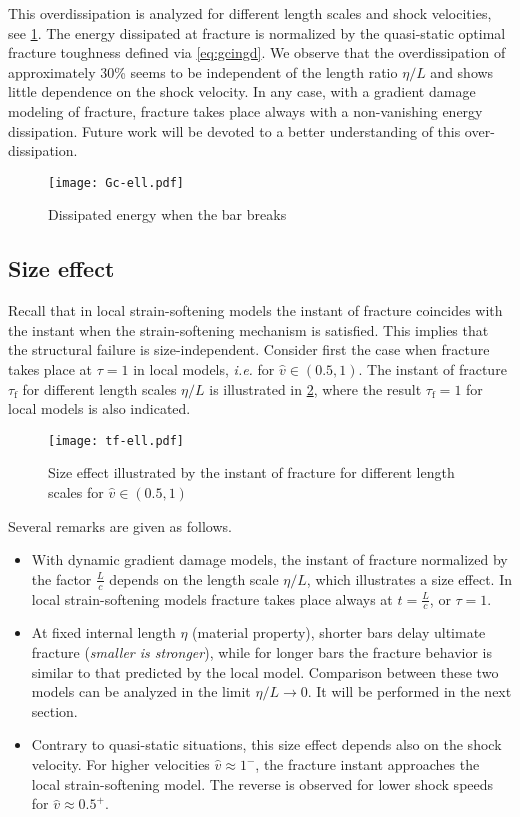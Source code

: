 This overdissipation is analyzed for different length scales and shock velocities, see \cref{fig:Gc-ell}. The energy dissipated at fracture is normalized by the quasi-static optimal fracture toughness defined via \eqref{eq:gcingd}. We observe that the overdissipation of approximately 30\% seems to be independent of the length ratio $\eta/L$ and shows little dependence on the shock velocity. In any case, with a gradient damage modeling of fracture, fracture takes place always with a non-vanishing energy dissipation. Future work will be devoted to a better understanding of this over-dissipation.
\begin{figure}[htbp]
\centering
\texttt{[image: Gc-ell.pdf]}
\caption{Dissipated energy when the bar breaks} \label{fig:Gc-ell}
\end{figure}

\subsection{Size effect}
Recall that in local strain-softening models the instant of fracture coincides with the instant when the strain-softening mechanism is satisfied. This implies that the structural failure is size-independent. Consider first the case when fracture takes place at $\tau=1$ in local models, \emph{i.e.} for $\widehat{v}\in(0.5,1)$. The instant of fracture $\tau_\mathrm{f}$ for different length scales $\eta/L$ is illustrated in \cref{fig:tfell}, where the result $\tau_\mathrm{f}=1$ for local models is also indicated.
\begin{figure}[htbp]
\centering
\texttt{[image: tf-ell.pdf]}
\caption{Size effect illustrated by the instant of fracture for different length scales for $\widehat{v}\in(0.5,1)$} \label{fig:tfell}
\end{figure}
Several remarks are given as follows.
\begin{itemize}
\item With dynamic gradient damage models, the instant of fracture normalized by the factor $\frac{L}{c}$ depends on the length scale $\eta/L$, which illustrates a size effect. In local strain-softening models fracture takes place always at $t=\frac{L}{c}$, or $\tau=1$.

\item At fixed internal length $\eta$ (material property), shorter bars delay ultimate fracture (\emph{smaller is stronger}), while for longer bars the fracture behavior is similar to that predicted by the local model. Comparison between these two models can be analyzed in the limit $\eta/L\to 0$. It will be performed in the next section.

\item Contrary to quasi-static situations, this size effect depends also on the shock velocity. For higher velocities $\widehat{v}\approx 1^-$, the fracture instant approaches the local strain-softening model. The reverse is observed for lower shock speeds for $\widehat{v}\approx 0.5^+$.
\end{itemize}


